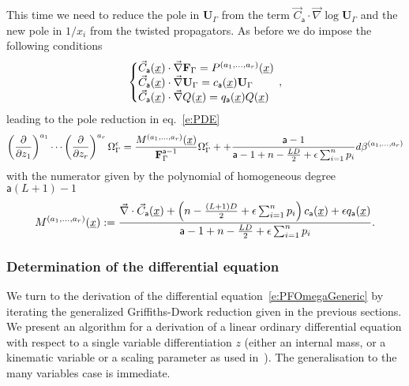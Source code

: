 \documentclass[a4paper,12pt]{article}
\numberwithin{equation}{section}
\numberwithin{figure}{section}
\begin{document}
%
This time we need to reduce the pole in $\mathbf{U}_\Gamma$ from  the term $\vec
    C_{\mathsf{a}}\cdot\vec\nabla\log\mathbf{U}_\Gamma$ and the new
    pole in $1/x_i$ from the twisted propagators.
    As before we do impose the following conditions
\begin{equation}\label{e:sysCFUAnReg}
   \left\{\begin{array}{@{}l@{}}
\vec C_{\mathsf{a}} (\underline x) \cdot \vec \nabla \textbf{F}_\Gamma
            =    P^{(a_1,\dots,a_r)}(\underline x)\\
\vec C_{\mathsf{a}} (\underline x)\cdot\vec \nabla\textbf{U}_\Gamma=
            c_{{\mathsf{a}}}(\underline x) \textbf{U}_\Gamma \\
            \vec C_{\mathsf{a}} (\underline x)\cdot\vec \nabla
            Q(\underline x)=
            q_{{\mathsf{a}}}(\underline x) Q(\underline x)
  \end{array}\right.\,,
\end{equation}
leading to the pole  reduction in eq.~\eqref{e:PDE} 
% 
\begin{equation}\label{e:RedFinalAnReg}
\left(\partial\over \partial z_1\right)^{a_1}\cdots\left(\partial
  \over\partial z_r\right)^{a_r} \Omega_\Gamma^\epsilon={
M^{(a_1,\dots,a_r)}
     (\underline x)
\over \textbf{F}_\Gamma^{\mathsf{a}-1}}\Omega_\Gamma^\epsilon
++{  \mathsf{a}-1 \over \mathsf{a}-1+n-{LD\over2}+\epsilon\sum_{i=1}^n p_i} d\beta^{(a_1,\dots,a_r)}
\end{equation}
with the numerator given by the polynomial of homogeneous degree $\mathsf{a}(L+1)-1$
\begin{equation}
  \label{e:MfinalAnReg}
  M^{(a_1,\dots,a_r)}(\underline x):={
\vec\nabla \cdot \vec C_{\mathsf{a}}
     (\underline x)
+   \left(n-{(L+1)D\over2}+\epsilon\sum_{i=1}^n p_i\right) 
    c_{\mathsf{a}}(\underline x)+\epsilon q_{\mathsf{a}}(\underline x)\over
    \mathsf{a}-1+n-{LD\over2}+\epsilon\sum_{i=1}^n p_i}.
\end{equation}
%


\subsubsection{Determination of the differential equation}
\label{sec:deriv-diff-equat}


We turn to the derivation of the differential
equation~\eqref{e:PFOmegaGeneric}  by iterating the generalized
Griffiths-Dwork reduction given in the previous sections. We present an algorithm for a derivation of
a linear ordinary differential equation with respect to a single
variable differentiation $z$ (either an internal mass, or a kinematic
variable or a scaling parameter as used
in~\cite{Lairez:2022zkj,Doran:2023yzu}). The generalisation to the
many variables case is immediate.
\end{document}
